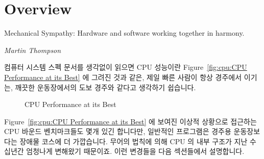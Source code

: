 
\section{Overview}
\label{sec:cpu:Overview}
%
\epigraph{Mechanical Sympathy: Hardware and software working together in
	  harmony.}{\emph{Martin Thompson}}

컴퓨터 시스템 스펙 문서를 생각없이 읽으면 CPU 성능이란
Figure~\ref{fig:cpu:CPU Performance at its Best} 에 그려진 것과 같은, 제일 빠른
사람이 항상 경주에서 이기는, 깨끗한 운동장에서의 도보 경주와 같다고 생각하기
쉽습니다.

\begin{figure}[htb]
\centering
{}
\caption{CPU Performance at its Best}
\end{figure}

Figure~\ref{fig:cpu:CPU Performance at its Best} 에 보여진 이상적 상황으로
접근하는 CPU 바운드 벤치마크들도 몇개 있긴 합니다만, 일반적인 프로그램은 경주용
운동장보다는 장애물 코스에 더 가깝습니다.
무어의 법칙에 의해 CPU 의 내부 구조가 지난 수십년간 엄청나게 변해왔기 때문이죠.
이런 변경들을 다음 섹션들에서 설명합니다.
\iffalse

